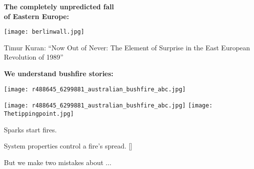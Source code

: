

  \textbf{The completely unpredicted fall\\ of Eastern Europe:}

  \texttt{[image: berlinwall.jpg]}

  {
    \small
    Timur Kuran:\cite{kuran1991a} 
    ``Now Out of Never: The Element of Surprise in the East European Revolution of 1989''
  }




  \textbf{We understand bushfire stories:}

      
    \texttt{[image: r488645\_6299881\_australian\_bushfire\_abc.jpg]}
    
    \texttt{[image: r488645\_6299881\_australian\_bushfire\_abc.jpg]}
    \texttt{[image: Thetippingpoint.jpg]}
  
  
   
    Sparks start fires.
  
    System properties control a fire's spread.
   []
    
     But we make two mistakes about ...
   





